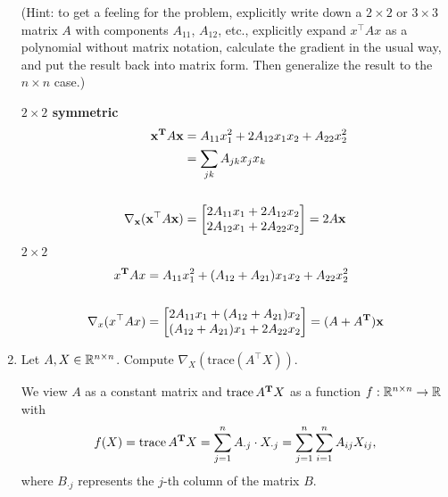 \begin{enumerate}[label=(\alph*)]
    (Hint: to get a feeling for the problem, explicitly write down a $2 \times 2$ or $3 \times 3$ matrix $A$ with components $A_{11}$, $A_{12}$, etc., explicitly expand $x^{\top}Ax$ as a polynomial without matrix notation, calculate the gradient in the usual way, and put the result back into matrix form. Then generalize the result to the $n \times n$ case.)
    \begin{mdframed}
      \textbf{$2 \times 2$ symmetric}
      \begin{align*}
        \mathbf x^{\mathbf{T}} A\mathbf x &= A_{11}x_1^2 + 2A_{12}x_1x_2 + A_{22}x_2^2 \\
                  &= \sum_{jk}A_{jk}x_jx_k \\
        \\
        \nabla_\mathbf x(\mathbf x^{\top} A\mathbf x) &=
        \begin{bmatrix}2A_{11}x_1 + 2A_{12}x_2\\2A_{12}x_1 + 2A_{22}x_2\end{bmatrix} = 2A\mathbf x
      \end{align*}
      \textbf{$2 \times 2$}
      \begin{align*}
        x^{\mathbf{T}} Ax &= A_{11}x_1^2 + (A_{12} + A_{21})x_1x_2 + A_{22}x_2^2 \\\\
        \nabla_x(x^{\top} Ax) &=
        \begin{bmatrix}2A_{11}x_1 + (A_{12} + A_{21})x_2\\(A_{12} + A_{21})x_1 + 2A_{22}x_2\end{bmatrix} = (A + A^{\mathbf{T}})\mathbf x
      \end{align*}
    \end{mdframed}

    \item Let $A, X \in \mathbb{R}^{n \times n}$. Compute $\nabla_X (\text{trace}(A^{\top}X))$.
    \begin{mdframed}
      We view $A$ as a constant matrix and $\operatorname{\text{trace}} A^{\mathbf{T}} X$ as a function
      $f:\mathbb{R}^{n \times n} \rightarrow \mathbb{R}$ with
      $$
      f(X)
      = \operatorname{\text{trace}} A^{\mathbf{T}} X
      = \sum_{j=1}^n A_{\cdot j} \cdot X_{\cdot j}
      = \sum_{j=1}^n \sum_{i=1}^n A_{ij}X_{ij},
      $$
      where $B_{\cdot j}$ represents the $j$-th column of the matrix $B$.


\end{mdframed}
\end{enumerate}
